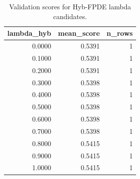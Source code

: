 \begin{table}[t]
\caption{Validation scores for Hyb-FPDE lambda candidates.}
\label{tab:lambda_distribution_computed}
\centering
\begin{tabular}{rrr}
\toprule
lambda\_hyb & mean\_score & n\_rows \\
\midrule
0.0000 & 0.5391 & 1 \\
0.1000 & 0.5391 & 1 \\
0.2000 & 0.5391 & 1 \\
0.3000 & 0.5398 & 1 \\
0.4000 & 0.5398 & 1 \\
0.5000 & 0.5398 & 1 \\
0.6000 & 0.5398 & 1 \\
0.7000 & 0.5398 & 1 \\
0.8000 & 0.5415 & 1 \\
0.9000 & 0.5415 & 1 \\
1.0000 & 0.5415 & 1 \\
\bottomrule
\end{tabular}

\end{table}
